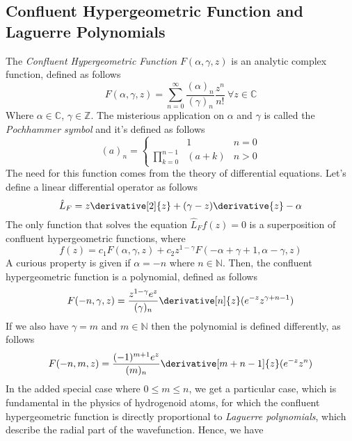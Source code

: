 \documentclass[a4paper, 11pt]{book}
\newcommand{\1}{\opr{\mathds{1}}}
\newcommand{\opr}[1]{\hat{#1}}
\theoremstyle{plain}
\begin{document}
	\subsection{Confluent Hypergeometric Function and Laguerre Polynomials}
	The \textit{Confluent Hypergeometric Function} $F(\alpha,\gamma,z)$ is an analytic complex function, defined as follows
	\begin{equation}
		F(\alpha,\gamma,z)=\sum_{n=0}^{\infty}\frac{(\alpha)_n}{(\gamma)_n}\frac{z^n}{n!}\ \forall z\in\mathbb{C}
		\label{eq:confluenthypergeometricgen}
	\end{equation}
	Where $\alpha\in\mathbb{C}$, $\gamma\in\mathbb{Z}$. The misterious application on $\alpha$ and $\gamma$ is called the \textit{Pochhammer symbol} and it's defined as follows
	\begin{equation}
		(a)_n=\left\{\begin{aligned}
				&1&n=0\\
				\prod_{k=0}^{n-1}&(a+k)&n>0
			\end{aligned}
		\right.
		\label{eq:pochhammer}
	\end{equation}
	The need for this function comes from the theory of differential equations. Let's define a linear differential operator as follows
	\begin{equation}
		\opr{L}_F=z\derivative[2]{z}+(\gamma-z)\derivative{z}-\alpha
		\label{eq:hypergeodiff}
	\end{equation}
	The only function that solves the equation $\opr{L}_Ff(z)=0$ is a superposition of confluent hypergeometric functions, where
	\begin{equation}
		f(z)=c_1F(\alpha,\gamma,z)+c_2z^{1-\gamma}F(-\alpha+\gamma+1,\alpha-\gamma,z)
		\label{eq:solutionhypgeo}
	\end{equation}
	A curious property is given if $\alpha=-n$ where $n\in\mathbb{N}$. Then, the confluent hypergeometric function is a polynomial, defined as follows
	\begin{equation}
		F(-n,\gamma,z)=\frac{z^{1-\gamma}e^z}{(\gamma)_n}\derivative[n]{z}(e^{-z}z^{\gamma+n-1})
		\label{eq:polynomialchf}
	\end{equation}
	If we also have $\gamma=m$ and $m\in\mathbb{N}$ then the polynomial is defined differently, as follows
	\begin{equation}
		F(-n,m,z)=\frac{(-1)^{m+1}e^z}{(m)_n}\derivative[m+n-1]{z}(e^{-z}z^n)
		\label{eq:polychf2}
	\end{equation}
	In the added special case where $0\le m\le n$, we get a particular case, which is fundamental in the physics of hydrogenoid atoms, for which the confluent hypergeometric function is directly proportional to \textit{Laguerre polynomials}, which describe the radial part of the wavefunction. Hence, we have
\end{document}
